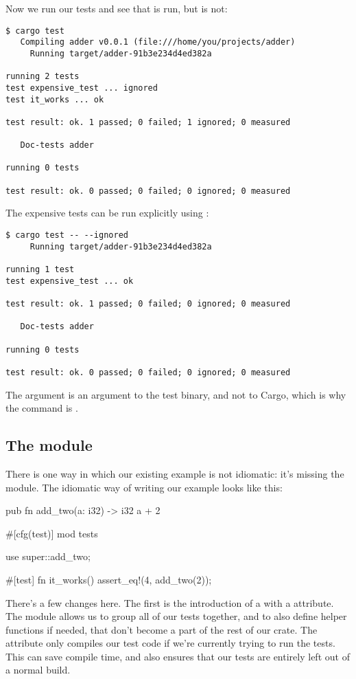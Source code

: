 Now we run our tests and see that  is run, but  is not:

\begin{verbatim}
$ cargo test
   Compiling adder v0.0.1 (file:///home/you/projects/adder)
     Running target/adder-91b3e234d4ed382a

running 2 tests
test expensive_test ... ignored
test it_works ... ok

test result: ok. 1 passed; 0 failed; 1 ignored; 0 measured

   Doc-tests adder

running 0 tests

test result: ok. 0 passed; 0 failed; 0 ignored; 0 measured
\end{verbatim}

The expensive tests can be run explicitly using :

\begin{verbatim}
$ cargo test -- --ignored
     Running target/adder-91b3e234d4ed382a

running 1 test
test expensive_test ... ok

test result: ok. 1 passed; 0 failed; 0 ignored; 0 measured

   Doc-tests adder

running 0 tests

test result: ok. 0 passed; 0 failed; 0 ignored; 0 measured
\end{verbatim}

The  argument is an argument to the test binary, and not to Cargo, which is why the command is 
.

\subsection*{The  module}

There is one way in which our existing example is not idiomatic: it's missing the  module. The idiomatic way of 
writing our example looks like this:

\begin{rustc}
pub fn add_two(a: i32) -> i32 {
    a + 2
}

#[cfg(test)]
mod tests {
    use super::add_two;

    #[test]
    fn it_works() {
        assert_eq!(4, add_two(2));
    }
}
\end{rustc}

There's a few changes here. The first is the introduction of a  with a  attribute. The module allows 
us to group all of our tests together, and to also define helper functions if needed, that don't become a part of the rest of 
our crate. The  attribute only compiles our test code if we're currently trying to run the tests. This can save compile 
time, and also ensures that our tests are entirely left out of a normal build.

